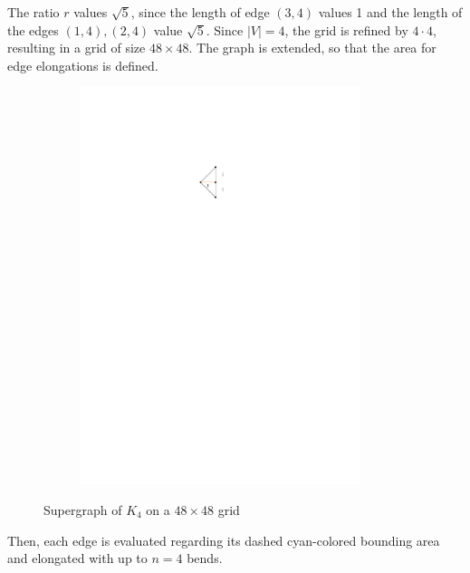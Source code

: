 The ratio $r$ values $\sqrt{5}$, since the length of edge $(3,4)$ values 1 and the length of the edges $(1,4),(2,4)$ value $\sqrt{5}$.
Since $\mid V\mid = 4$, the grid is refined by $4\cdot 4$, resulting in a grid of size $48\times48$. The graph is extended, so that the area for edge elongations is defined.
	\begin{figure}[H]
	\centering
	\begin{subfigure}{0.6\linewidth}
		\centering
		\includegraphics[width=0.9\textwidth,page=12]{drawings/maximal_planar.pdf}
	\end{subfigure}
	\caption{Supergraph of $K_4$ on a $48\times48$ grid}
\end{figure}
Then, each edge is evaluated regarding its dashed cyan-colored bounding area and elongated with up to $n = 4$ bends.

